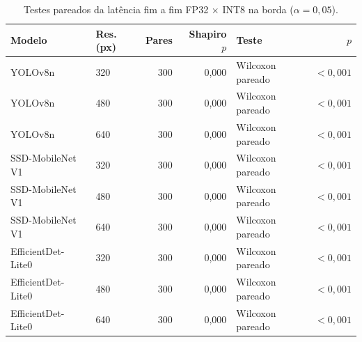 \begin{table}[t]
\centering
\footnotesize
\caption{Testes pareados da latência fim a fim FP32 $\times$ INT8 na borda ($\alpha = 0{,}05$).}
\label{tab:testes_fp32_int8}
\setlength{\tabcolsep}{4pt}
\begin{tabular}{@{}llrrlr@{}}
\toprule
Modelo & {Res. (px)} & Pares & {Shapiro $p$} & Teste & {$p$} \\
\midrule
YOLOv8n & 320 & 300 & 0,000 & Wilcoxon pareado & {$<0{,}001$} \\
YOLOv8n & 480 & 300 & 0,000 & Wilcoxon pareado & {$<0{,}001$} \\
YOLOv8n & 640 & 300 & 0,000 & Wilcoxon pareado & {$<0{,}001$} \\
SSD-MobileNet V1 & 320 & 300 & 0,000 & Wilcoxon pareado & {$<0{,}001$} \\
SSD-MobileNet V1 & 480 & 300 & 0,000 & Wilcoxon pareado & {$<0{,}001$} \\
SSD-MobileNet V1 & 640 & 300 & 0,000 & Wilcoxon pareado & {$<0{,}001$} \\
EfficientDet-Lite0 & 320 & 300 & 0,000 & Wilcoxon pareado & {$<0{,}001$} \\
EfficientDet-Lite0 & 480 & 300 & 0,000 & Wilcoxon pareado & {$<0{,}001$} \\
EfficientDet-Lite0 & 640 & 300 & 0,000 & Wilcoxon pareado & {$<0{,}001$} \\
\bottomrule
\end{tabular}
\end{table}
